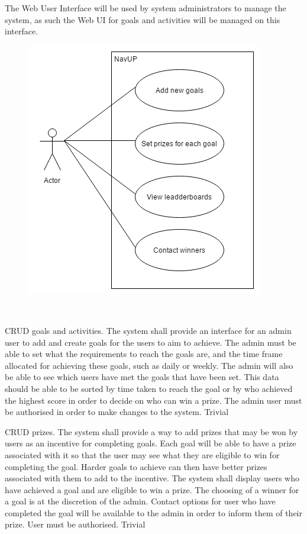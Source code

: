 The Web User Interface will be used by system administrators to manage the system, as such the Web UI for goals and activities will be managed on this interface.
\begin{figure}[h]
  \includegraphics[width=\textwidth]{diagrams/Specific_Requirements/Goals_WebUI_Actor_Syetem_Interaction.png}
\end{figure}
\\
\bigskip

\FuncReq
{CRUD goals and activities.}
{The system shall provide an interface for an admin user to add and create goals for the users to aim to achieve. The admin must be able to set what the requirements to reach the goals are, and the time frame allocated for achieving these goals, such as daily or weekly. The admin will also be able to see which users have met the goals that have been set. This data should be able  to be sorted by time taken to reach the goal or by who achieved the highest score in order to decide on who can win a prize.}
{The admin user must be authorised in order to make changes to the system.}
{Trivial}

\FuncReq
{CRUD prizes.}
{The system shall provide a way to add prizes that may be won by users as an incentive for completing goals. Each goal will be able to have a prize associated with it so that the user may see what they are eligible to win for completing the goal. Harder goals to achieve can then have better prizes associated with them to add to the incentive. The system shall display users who have achieved a goal and are eligible to win a prize. The choosing of a winner for a goal is at the discretion of the admin. Contact options for user who have completed the goal will be available to the admin in order to inform them of their prize.}
{User must be authorised.}
{Trivial}
